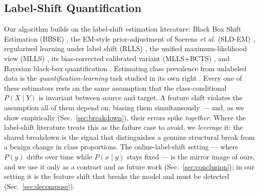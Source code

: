 \subsection{Label-Shift Quantification}
Our algorithm builds on the label-shift estimation literature: Black Box Shift
Estimation (BBSE) \cite{lipton2018bbse}, the EM-style prior-adjustment of
Saerens \emph{et al.} (SLD-EM) \cite{saerens2002sld}, regularized learning under
label shift (RLLS) \cite{azizzadenesheli2019rlls}, the unified
maximum-likelihood view (MLLS) \cite{garg2020mlls}, its bias-corrected
calibrated variant (MLLS+BCTS) \cite{alexandari2020mlls}, and Bayesian black-box
quantification \cite{ziegler2023bayesian}. Estimating class prevalence from
unlabeled data is the \emph{quantification-learning} task studied in its own right
\cite{gonzalez2017quant}. Every one of these
estimators rests on the same assumption that the class-conditional $P(X\mid Y)$
is invariant between source and target. A feature shift violates the assumption
all of them depend on, biasing them simultaneously --- and, as we show empirically
(Sec.~\ref{sec:breakdown}), their errors spike \emph{together}. Where the label-shift
literature treats this as the failure case to avoid, we \emph{leverage} it: the
shared breakdown is the signal that distinguishes a genuine structural
break from a benign change in class proportions. The online-label-shift
setting --- where $P(y)$ drifts over time while $P(x\mid y)$ stays fixed --- is the
mirror image of ours, and we use it only as a contrast and as future work
(Sec.~\ref{sec:conclusion}); in our setting it is the feature shift that breaks
the model and must be detected (Sec.~\ref{sec:decompose}).

